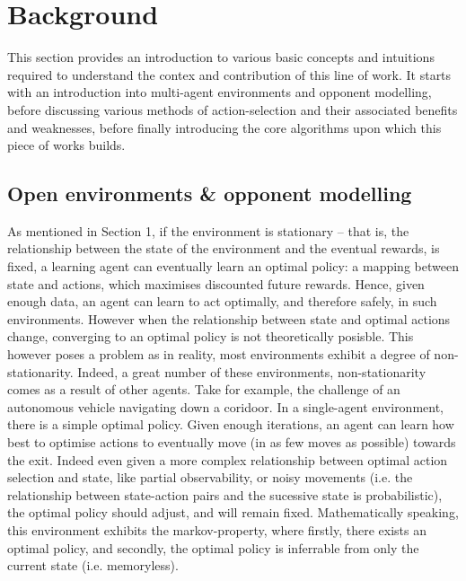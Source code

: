 \section{Background}\label{Background}
This section provides an introduction to various basic concepts and intuitions required to understand the contex and contribution of this line of work. It starts with an introduction into multi-agent environments and opponent modelling, before discussing various methods of action-selection and their associated benefits and weaknesses, before finally introducing the core algorithms upon which this piece of works builds. 

\subsection{Open environments \& opponent modelling}
As mentioned in Section 1, if the environment is stationary -- that is, the relationship between the state of the environment and the eventual rewards, is fixed, a learning agent can eventually learn an optimal policy: a mapping between state and actions, which maximises discounted future rewards. 
Hence, given enough data, an agent can learn to act optimally, and therefore safely, in such environments. However when the relationship between state and optimal actions change, converging to an optimal policy is not theoretically posisble. This however poses a problem as in reality, most environments exhibit a degree of non-stationarity. Indeed, a great number of these environments, non-stationarity comes as a result of other agents. Take for example, the challenge of an autonomous vehicle navigating down a coridoor. 
\newline \newline
In a single-agent environment, there is a simple optimal policy. Given enough iterations, an agent can learn how best to optimise actions to eventually move (in as few moves as possible) towards the exit. 
\newline \newline
Indeed even given a more complex relationship between optimal action selection and state, like partial observability, or noisy movements (i.e. the relationship between state-action pairs and the sucessive state is probabilistic), the optimal policy should adjust, and will remain fixed. Mathematically speaking, this environment exhibits the markov-property, where firstly, there exists an optimal policy, and secondly, the optimal policy is inferrable from only the current state (i.e. memoryless).
